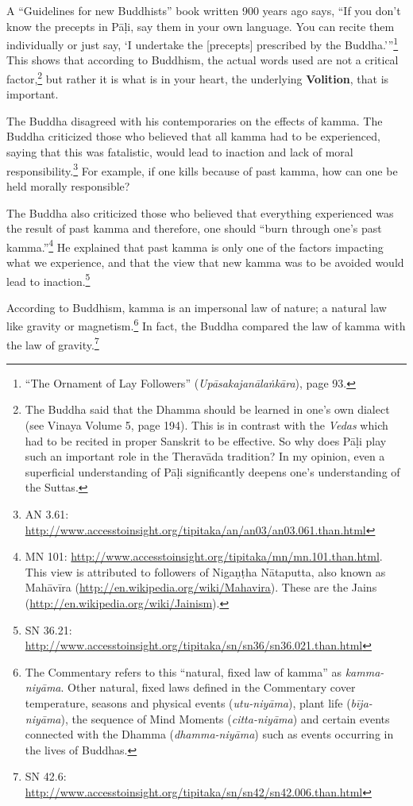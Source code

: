 A “Guidelines for new Buddhists” book written 900 years ago says, “If you don’t know the precepts in Pāḷi, say them in your own language. You can recite them individually or just say, ‘I undertake the [precepts] prescribed by the Buddha.’”\footnote{“The Ornament of Lay Followers” (\textit{Upāsakajanālaṅkāra}), page 93.} This shows that according to Buddhism, the actual words used are not a critical factor,\footnote{The Buddha said that the Dhamma should be learned in one’s own dialect (see Vinaya Volume 5, page 194). This is in contrast with the \textit{Vedas} which had to be recited in proper Sanskrit to be effective. So why does Pāḷi play such an important role in the Theravāda tradition? In my opinion, even a superficial understanding of Pāḷi significantly deepens one’s understanding of the Suttas.} but rather it is what is in your heart, the underlying \textbf{Volition}, that is important.

The Buddha disagreed with his contemporaries on the effects of kamma. The Buddha criticized those who believed that all kamma had to be experienced, saying that this was fatalistic, would lead to inaction and lack of moral responsibility.\footnote{AN 3.61: \url{http://www.accesstoinsight.org/tipitaka/an/an03/an03.061.than.html}} For example, if one kills because of past kamma, how can one be held morally responsible? 

The Buddha also criticized those who believed that everything experienced was the result of past kamma and therefore, one should “burn through one’s past kamma.”\footnote{MN 101: \url{http://www.accesstoinsight.org/tipitaka/mn/mn.101.than.html}. This view is attributed to followers of Nigaṇṭha Nātaputta, also known as Mahāvīra (\url{http://en.wikipedia.org/wiki/Mahavira}). These are the Jains (\url{http://en.wikipedia.org/wiki/Jainism}).} He explained that past kamma is only one of the factors impacting what we experience, and that the view that new kamma was to be avoided would lead to inaction.\footnote{SN 36.21: \url{http://www.accesstoinsight.org/tipitaka/sn/sn36/sn36.021.than.html}}

According to Buddhism, kamma is an impersonal law of nature; a natural law like gravity or magnetism.\footnote{The Commentary refers to this “natural, fixed law of kamma” as \textit{kamma-niyāma}. Other natural, fixed laws defined in the Commentary cover temperature, seasons and physical events (\textit{utu-niyāma}), plant life (\textit{bīja-niyāma}), the sequence of Mind Moments (\textit{citta-niyāma}) and certain events connected with the Dhamma (\textit{dhamma-niyāma}) such as events occurring in the lives of Buddhas.} In fact, the Buddha compared the law of kamma with the law of gravity.\footnote{SN 42.6: \url{http://www.accesstoinsight.org/tipitaka/sn/sn42/sn42.006.than.html}}

